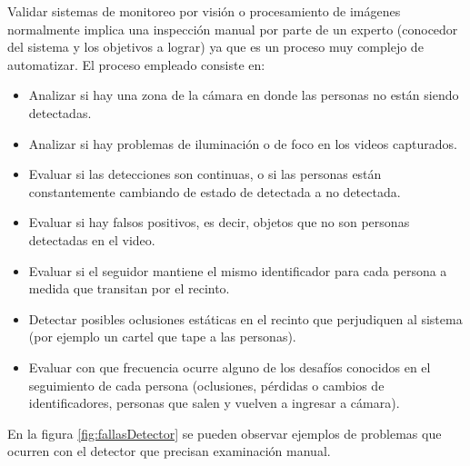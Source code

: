 Validar sistemas de monitoreo por visión o procesamiento de imágenes normalmente implica una inspección manual por parte de un experto (conocedor del sistema y los objetivos a lograr) ya que es un proceso muy complejo de automatizar. El proceso empleado consiste en:

\begin{itemize}
\item Analizar si hay una zona de la cámara en donde las personas no están siendo detectadas.
\item Analizar si hay problemas de iluminación o de foco en los videos capturados.
\item Evaluar si las detecciones son continuas, o si las personas están constantemente cambiando de estado de detectada a no detectada.
\item Evaluar si hay falsos positivos, es decir, objetos que no son personas detectadas en el video.
\item Evaluar si el seguidor mantiene el mismo identificador para cada persona a medida que transitan por el recinto.
\item Detectar posibles oclusiones estáticas en el recinto que perjudiquen al sistema (por ejemplo un cartel que tape a las personas).
\item Evaluar con que frecuencia ocurre alguno de los desafíos conocidos en el seguimiento de cada persona (oclusiones, pérdidas o cambios de identificadores, personas que salen y vuelven a ingresar a cámara).
\end{itemize}

En la figura \ref{fig:fallasDetector} se pueden observar ejemplos de problemas que ocurren con el detector que precisan examinación manual.


\newpage

